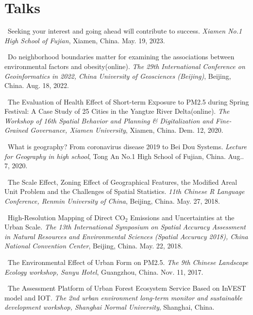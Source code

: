 \section*{Talks}
\begin{etaremune}
\item
    \Shaoqing\
    Seeking your interest and going ahead will contribute to success.
    \textit{Xiamen No.1 High School of Fujian}, Xiamen, China.
    May. 19, 2023.
    \invited
\item
    \Shaoqing\
    Do neighborhood boundaries matter for examining the associations between environmental factors and obesity(online).
    \textit{The 29th International Conference on Geoinformatics in 2022, China University of Geosciences (Beijing)}, Beijing, China.
    Aug. 18, 2022.
    \invited
\item
    \Shaoqing\
    The Evaluation of Health Effect of Short-term Exposure to PM2.5 during Spring Festival: A Case Study of 25 Cities in the Yangtze River Delta(online).
    \textit{The Workshop of 16th Spatial Behavior and Planning \& Digitalization and Fine-Grained Governance, Xiamen University}, Xiamen, China.
    Dem. 12, 2020.
    \invited
\item
    \Shaoqing\
    What is geography? From coronavirus disease 2019 to Bei Dou Systems.
    \textit{Lecture for Geography in high school}, Tong An No.1 High School of Fujian, China.
    Aug.. 7, 2020.
\item
    \Shaoqing\
    The Scale Effect, Zoning Effect of Geographical Features, the Modified Areal Unit Problem and the Challenges of Spatial Statistics.
    \textit{11th Chinese R Language Conference, Renmin University of China}, Beijing, China.
    May. 27, 2018.
\item
    \Shaoqing\
    High-Resolution Mapping of Direct CO$_2$ Emissions and Uncertainties at the Urban Scale.
    \textit{The 13th International Symposium on Spatial Accuracy Assessment in Natural Resources and Environmental Sciences (Spatial Accuracy 2018), China National Convention Center}, Beijing, China.
    May. 22, 2018.
\item
    \Shaoqing\
    The Environmental Effect of Urban Form on PM2.5. 
    \textit{The 9th Chinese Landscape Ecology workshop, Sanyu Hotel}, Guangzhou, China.
    Nov. 11, 2017.
\item
    \Shaoqing\
    The Assessment Platform of Urban Forest Ecosystem Service Based on InVEST model and IOT.
    \textit{The 2nd urban environment long-term monitor and sustainable development workshop, Shanghai Normal University}, Shanghai, China.

\end{etaremune}
